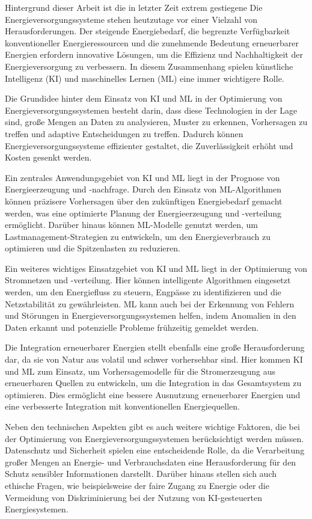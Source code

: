 Hintergrund dieser Arbeit ist die in letzter Zeit extrem gestiegene Die
Energieversorgungssysteme stehen heutzutage vor einer Vielzahl von
Herausforderungen. Der steigende Energiebedarf, die begrenzte Verfügbarkeit
konventioneller Energieressourcen und die zunehmende Bedeutung erneuerbarer
Energien erfordern innovative Lösungen, um die Effizienz und Nachhaltigkeit der
Energieversorgung zu verbessern. In diesem Zusammenhang spielen künstliche
Intelligenz (KI) und maschinelles Lernen (ML) eine immer wichtigere Rolle.

Die Grundidee hinter dem Einsatz von KI und ML in der Optimierung von
Energieversorgungssystemen besteht darin, dass diese Technologien in der Lage
sind, große Mengen an Daten zu analysieren, Muster zu erkennen, Vorhersagen zu
treffen und adaptive Entscheidungen zu treffen. Dadurch können
Energieversorgungssysteme effizienter gestaltet, die Zuverlässigkeit erhöht und
Kosten gesenkt werden.

Ein zentrales Anwendungsgebiet von KI und ML liegt in der Prognose von
Energieerzeugung und -nachfrage. Durch den Einsatz von ML-Algorithmen können
präzisere Vorhersagen über den zukünftigen Energiebedarf gemacht werden, was
eine optimierte Planung der Energieerzeugung und -verteilung ermöglicht.
Darüber hinaus können ML-Modelle genutzt werden, um Lastmanagement-Strategien
zu entwickeln, um den Energieverbrauch zu optimieren und die Spitzenlasten zu
reduzieren.

Ein weiteres wichtiges Einsatzgebiet von KI und ML liegt in der Optimierung von
Stromnetzen und -verteilung. Hier können intelligente Algorithmen eingesetzt
werden, um den Energiefluss zu steuern, Engpässe zu identifizieren und die
Netzstabilität zu gewährleisten. ML kann auch bei der Erkennung von Fehlern und
Störungen in Energieversorgungssystemen helfen, indem Anomalien in den Daten
erkannt und potenzielle Probleme frühzeitig gemeldet werden.

Die Integration erneuerbarer Energien stellt ebenfalls eine große
Herausforderung dar, da sie von Natur aus volatil und schwer vorhersehbar sind.
Hier kommen KI und ML zum Einsatz, um Vorhersagemodelle für die Stromerzeugung
aus erneuerbaren Quellen zu entwickeln, um die Integration in das Gesamtsystem
zu optimieren. Dies ermöglicht eine bessere Ausnutzung erneuerbarer Energien
und eine verbesserte Integration mit konventionellen Energiequellen.

Neben den technischen Aspekten gibt es auch weitere wichtige Faktoren, die bei
der Optimierung von Energieversorgungssystemen berücksichtigt werden müssen.
Datenschutz und Sicherheit spielen eine entscheidende Rolle, da die
Verarbeitung großer Mengen an Energie- und Verbrauchsdaten eine Herausforderung
für den Schutz sensibler Informationen darstellt. Darüber hinaus stellen sich
auch ethische Fragen, wie beispielsweise der faire Zugang zu Energie oder die
Vermeidung von Diskriminierung bei der Nutzung von KI-gesteuerten
Energiesystemen.

